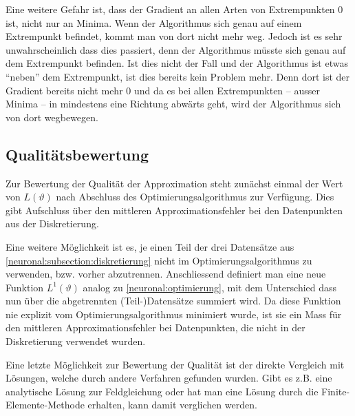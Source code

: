 Eine weitere Gefahr ist, dass der Gradient an allen Arten von Extrempunkten 0 ist, nicht nur an Minima.
Wenn der Algorithmus sich genau auf einem Extrempunkt befindet, kommt man von dort nicht mehr weg.
Jedoch ist es sehr unwahrscheinlich dass dies passiert, denn der Algorithmus müsste sich genau auf dem Extrempunkt befinden.
Ist dies nicht der Fall und der Algorithmus ist etwas ``neben'' dem Extrempunkt, ist dies bereits kein Problem mehr.
Denn dort ist der Gradient bereits nicht mehr 0 und da es bei allen Extrempunkten -- ausser Minima -- in mindestens eine Richtung abwärts geht, wird der Algorithmus sich von dort wegbewegen.


\subsection{Qualitätsbewertung}\label{neuronal:subsection:qualitaetsbewertung}
Zur Bewertung der Qualität der Approximation steht zunächst einmal der Wert von $L(\vartheta)$ nach Abschluss des Optimierungsalgorithmus zur Verfügung.
Dies gibt Aufschluss über den mittleren Approximationsfehler bei den Datenpunkten aus der Diskretierung.

Eine weitere Möglichkeit ist es, je einen Teil der drei Datensätze aus \ref{neuronal:subsection:diskretierung} nicht im Optimierungsalgorithmus zu verwenden, bzw. vorher abzutrennen.
Anschliessend definiert man eine neue Funktion $L^1(\vartheta)$ analog zu \eqref{neuronal:optimierung}, mit dem Unterschied dass nun über die abgetrennten (Teil-)Datensätze summiert wird.
Da diese Funktion nie explizit vom Optimierungsalgorithmus minimiert wurde, ist sie ein Mass für den mittleren Approximationsfehler bei Datenpunkten, die nicht in der Diskretierung verwendet wurden.

Eine letzte Möglichkeit zur Bewertung der Qualität ist der direkte Vergleich mit Lösungen, welche durch andere Verfahren gefunden wurden.
Gibt es z.B. eine analytische Lösung zur Feldgleichung oder hat man eine Lösung durch die Finite-Elemente-Methode erhalten, kann damit verglichen werden.
